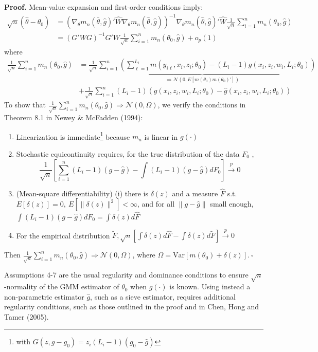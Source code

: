 \documentclass[12pt]{article}
\newcommand{\toP}{\overset{p}{\to}}
\begin{document}
\textbf{Proof.} Mean-value expansion and first-order conditions imply:
\begin{align*} \sqrt{n}(\hat{\theta}-\theta_0) &= (\nabla_{\theta}m_n(\bar{\theta},\hat{g})' \hat{W} \nabla_{\theta} m_n(\hat{\theta},\hat{g}))^{-1}  \nabla_{\theta} m_n(\hat{\theta},\hat{g})' \hat{W} \frac{1}{\sqrt{n}}\sum_{i=1}^n m_n(\theta_0,\hat{g})\\
&= (G'WG)^{-1}G'W\frac{1}{\sqrt{n}}\sum_{i=1}^n m_n(\theta_0,\hat{g}) + o_p(1)
\end{align*}
where \begin{align*}
     \frac{1}{\sqrt{n}} \sum_{i=1}^n m_n(\theta_0,\hat{g}) &= \underbrace{\frac{1}{\sqrt{n}} \sum_{i=1}^n \left( \sum_{\ell =1}^{L_i} m(y_{i\ell}, x_i, z_i; \theta_0) - (L_i - 1) g(x_i,z_i, w_i, L_i; \theta_0)\right)}_{\Rightarrow \mathcal{N}(0, E[m(\theta_0)m(\theta_0)'])}  \\&+ \frac{1}{\sqrt{n}}\sum_{i=1}^n (L_i-1)\left(g(x_i,z_i,w_i,L_i; \theta_0) - \hat{g}(x_i,z_i,w_i,L_i;\theta_0)\right)  
 \end{align*}
To show that $\frac{1}{\sqrt{n}}\sum_{i=1}^n m_n(\theta_0,\hat{g}) \Rightarrow \mathcal{N}(0, \Omega)$, we verify the conditions in Theorem 8.1 in Newey \& McFadden (1994):

\begin{enumerate}
    \item Linearization is immediate\footnote{with $G(z,g-g_0) = z_i(L_i-1)(g_0-\hat{g})$} because $m_n$ is linear in $g(\cdot)$
    \item Stochastic equicontinuity requires, for the true distribution of the data $F_0$ , 
    $$\frac{1}{\sqrt{n}}\left[\sum_{i=1}^n  (L_i-1)(g-\hat{g}) - \int (L_i-1)(g-\hat{g}) d F_0 \right] \toP 0 $$ 
    \item (Mean-square differentiability) (i) there is $\delta(z)$ and a measure $\hat{F}$ s.t. $E[\delta(z)] = 0, \ E[\lVert \delta(z)\rVert^2] < \infty $, and for all $\lVert g-\hat{g}\rVert$ small enough, $\int (L_i-1)(g-\hat{g})dF_0 = \int \delta(z) d \hat{F}$
    \item For the empirical distribution $\tilde{F}, \sqrt{n}\left[\int \delta(z)d\hat{F} - \int \delta(z) d\tilde{F}\right] \toP 0$
\end{enumerate}

Then $\frac{1}{\sqrt{n}}\sum_{i=1}^n m_n(\theta_0,\hat{g}) \Rightarrow \mathcal{N}(0, \Omega)$, where $\Omega = \text{Var}[m(\theta_0) + \delta(z)].\ \square$

 

Assumptions 4-7 are the usual regularity and dominance conditions to ensure $\sqrt{n}$-normality of the GMM estimator of $\theta_0$ when $g(\cdot)$ is known.  Using instead a non-parametric estimator $\hat{g}$, such as a sieve estimator, requires additional regularity conditions, such as those outlined in the proof and in Chen, Hong and Tamer (2005). 





\end{document}
